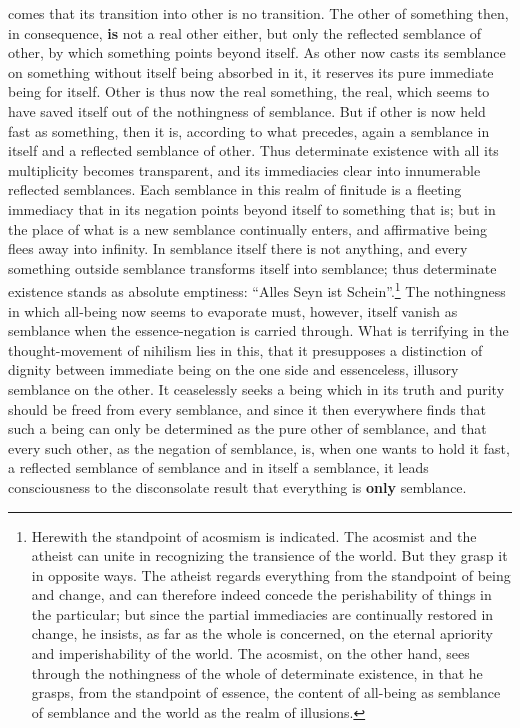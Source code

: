 \documentclass[12pt,a4paper,openany]{book}
\newcommand{\opage}[1]{\marginnote{\footnotesize\textit{[#1]}}}
\begin{document}
\opage{98}comes that its transition into other is no transition. The other of something then, in consequence, \textbf{is} not a real other either, but only the reflected semblance of other, by which something points beyond itself. As other now casts its semblance on something without itself being absorbed in it, it reserves its pure immediate being for itself. Other is thus now the real something, the real, which seems to have saved itself out of the nothingness of semblance. But if other is now held fast as something, then it is, according to what precedes, again a semblance in itself and a reflected semblance of other. Thus determinate existence with all its multiplicity becomes transparent, and its immediacies clear into innumerable reflected semblances. Each semblance in this realm of finitude is a fleeting immediacy that in its negation points beyond itself to something that is; but in the place of what is a new semblance continually enters, and affirmative being flees away into infinity. In semblance itself there is not anything, and every something outside semblance transforms itself into semblance; thus determinate existence stands as absolute emptiness: ``Alles Seyn ist Schein''.\footnote{Herewith the standpoint of acosmism is indicated. The acosmist and the atheist can unite in recognizing the transience of the world. But they grasp it in opposite ways. The atheist regards everything from the standpoint of being and change, and can therefore indeed concede the perishability of things in the particular; but since the partial immediacies are continually restored in change, he insists, as far as the whole is concerned, on the eternal apriority and imperishability of the world. The acosmist, on the other hand, sees through the nothingness of the whole of determinate existence, in that he grasps, from the standpoint of essence, the content of all-being as semblance of semblance and the world as the realm of illusions.}
 The nothingness in which all-being now seems to evaporate must, however, itself vanish as semblance when the
\setcounter{footnote}{0}%
\opage{99}essence-negation is carried through. What is terrifying in the thought-movement of nihilism lies in this, that it presupposes a distinction of dignity between immediate being on the one side and essenceless, illusory semblance on the other. It ceaselessly seeks a being which in its truth and purity should be freed from every semblance, and since it then everywhere finds that such a being can only be determined as the pure other of semblance, and that every such other, as the negation of semblance, is, when one wants to hold it fast, a reflected semblance of semblance and in itself a semblance, it leads consciousness to the disconsolate result that everything is \textbf{only} semblance.
\end{document}

